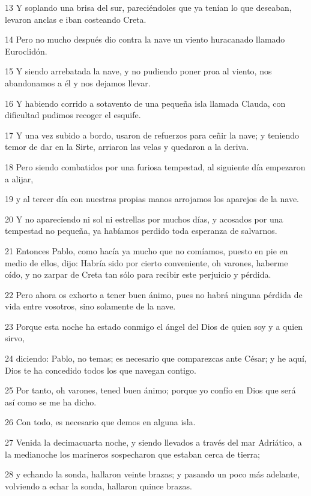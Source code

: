 \par 13 Y soplando una brisa del sur, pareciéndoles que ya tenían lo que deseaban, levaron anclas e iban costeando Creta.
\par 14 Pero no mucho después dio contra la nave un viento huracanado llamado Euroclidón.
\par 15 Y siendo arrebatada la nave, y no pudiendo poner proa al viento, nos abandonamos a él y nos dejamos llevar.
\par 16 Y habiendo corrido a sotavento de una pequeña isla llamada Clauda, con dificultad pudimos recoger el esquife.
\par 17 Y una vez subido a bordo, usaron de refuerzos para ceñir la nave; y teniendo temor de dar en la Sirte, arriaron las velas y quedaron a la deriva.
\par 18 Pero siendo combatidos por una furiosa tempestad, al siguiente día empezaron a alijar,
\par 19 y al tercer día con nuestras propias manos arrojamos los aparejos de la nave.
\par 20 Y no apareciendo ni sol ni estrellas por muchos días, y acosados por una tempestad no pequeña, ya habíamos perdido toda esperanza de salvarnos.
\par 21 Entonces Pablo, como hacía ya mucho que no comíamos, puesto en pie en medio de ellos, dijo: Habría sido por cierto conveniente, oh varones, haberme oído, y no zarpar de Creta tan sólo para recibir este perjuicio y pérdida.
\par 22 Pero ahora os exhorto a tener buen ánimo, pues no habrá ninguna pérdida de vida entre vosotros, sino solamente de la nave.
\par 23 Porque esta noche ha estado conmigo el ángel del Dios de quien soy y a quien sirvo,
\par 24 diciendo: Pablo, no temas; es necesario que comparezcas ante César; y he aquí, Dios te ha concedido todos los que navegan contigo.
\par 25 Por tanto, oh varones, tened buen ánimo; porque yo confío en Dios que será así como se me ha dicho.
\par 26 Con todo, es necesario que demos en alguna isla.
\par 27 Venida la decimacuarta noche, y siendo llevados a través del mar Adriático, a la medianoche los marineros sospecharon que estaban cerca de tierra;
\par 28 y echando la sonda, hallaron veinte brazas; y pasando un poco más adelante, volviendo a echar la sonda, hallaron quince brazas.
